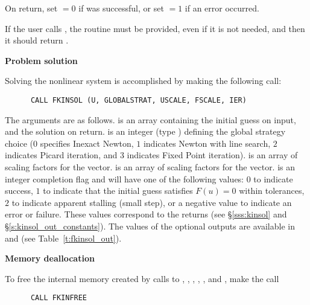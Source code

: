 \begin{Steps}
  On return, set  $= 0$ if  was successful, or set  $= 1$
  if an error occurred.
  
  {\warn} If the user calls , the routine  must
  be provided, even if it is not needed, and then it should return .

\item {\bf Problem solution}

  Solving the nonlinear system is accomplished by making the following call:
\begin{verbatim}
      CALL FKINSOL (U, GLOBALSTRAT, USCALE, FSCALE, IER)
\end{verbatim}
  The arguments are as follows.
   is an array containing the initial guess on input, and the
  solution on return.
   is an integer (type ) defining the global strategy 
  choice ($0$ specifies Inexact Newton, $1$ indicates Newton with line search,
  $2$ indicates Picard iteration, and $3$ indicates Fixed Point iteration).
   is an array of scaling factors for the  vector.
   is an array of scaling factors for the  vector.
   is an integer completion flag and will have one of the following values:
  $0$ to indicate success,
  $1$ to indicate that the initial guess satisfies $F(u) = 0$ within tolerances,
  $2$ to indicate apparent stalling (small step), or a negative value to indicate
  an error or failure. These values correspond to the  returns
  (see \S\ref{sss:kinsol} and \S\ref{s:kinsol_out_constants}). The values of
  the optional outputs are available in  and 
  (see Table~\ref{t:fkinsol_out}).

\item {\bf Memory deallocation}

  To free the internal memory created by calls to ,
  , , , , and
  , make the call
\begin{verbatim}
      CALL FKINFREE
\end{verbatim}

\end{Steps}


